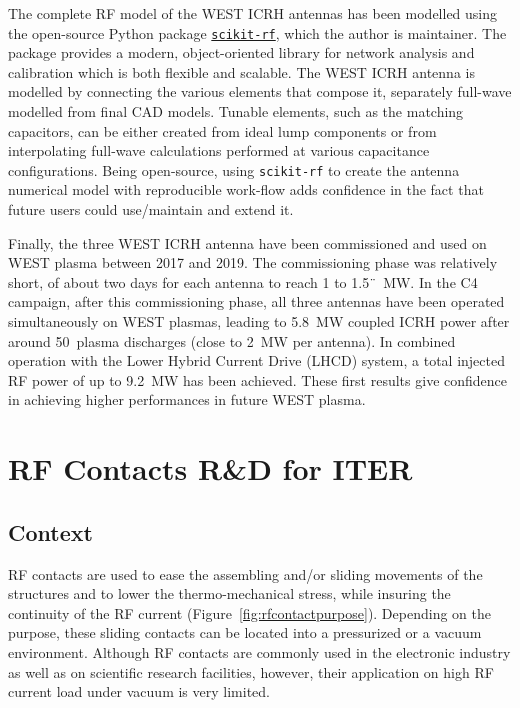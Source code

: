 {The complete RF model of the WEST ICRH antennas has been modelled using the open-source Python package \href{http://scikit-rf.org/}{\texttt{scikit-rf}}, which the author is maintainer. The package provides a modern, object-oriented library for network analysis and calibration which is both flexible and scalable. The WEST ICRH antenna is modelled by connecting the various elements that compose it, separately full-wave modelled from final CAD models. Tunable elements, such as the matching capacitors, can be either created from ideal lump components or from interpolating full-wave calculations performed at various capacitance configurations. Being open-source, using \texttt{scikit-rf} to create the antenna numerical model with reproducible work-flow adds confidence in the fact that future users could use/maintain and extend it.

Finally, the three WEST ICRH antenna have been commissioned and used on WEST plasma between 2017 and 2019. The commissioning phase was relatively short, of about two days for each antenna to reach 1 to 1.5¨~MW. In the C4 campaign, after this commissioning phase, all three antennas have been operated simultaneously on WEST plasmas, leading to 5.8~MW coupled ICRH power after around 50~plasma discharges (close to 2~MW per antenna). %
In combined operation with the Lower Hybrid Current Drive (LHCD) system, a total injected RF power of up to 9.2~MW has been achieved. These first results give confidence in achieving higher performances in future WEST plasma.


\clearpage

\section{RF Contacts R\&D for ITER}\label{sec:RF_contacts}
\subsection{Context}
RF contacts are used to ease the assembling and/or sliding movements of the structures and to lower the thermo-mechanical stress, while insuring the continuity of the RF current (Figure~\ref{fig:rfcontactpurpose}). Depending on the purpose, these sliding contacts can be located into a pressurized or a vacuum environment. Although RF contacts are commonly used in the electronic industry as well as on scientific research facilities, however, their application on high RF current load under vacuum is very limited. 

}
